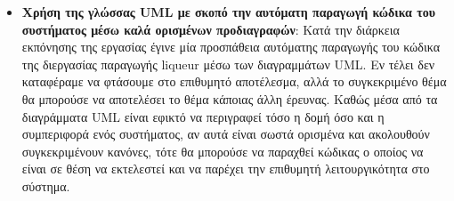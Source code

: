 \begin{itemize}
	\item{\textbf{Χρήση της γλώσσας UML με σκοπό την αυτόματη παραγωγή κώδικα του συστήματος μέσω καλά ορισμένων προδιαγραφών}: Κατά την διάρκεια εκπόνησης της εργασίας έγινε μία προσπάθεια αυτόματης παραγωγής του κώδικα της διεργασίας παραγωγής liqueur μέσω των διαγραμμάτων UML. Εν τέλει δεν καταφέραμε να φτάσουμε στο επιθυμητό αποτέλεσμα, αλλά το συγκεκριμένο θέμα θα μπορούσε να αποτελέσει το θέμα κάποιας άλλη έρευνας. Καθώς μέσα από τα διαγράμματα UML είναι εφικτό να περιγραφεί τόσο η δομή όσο και η συμπεριφορά ενός συστήματος, αν αυτά είναι σωστά ορισμένα και ακολουθούν συγκεκριμένουν κανόνες, τότε θα μπορούσε να παραχθεί κώδικας ο οποίος να είναι σε θέση να εκτελεστεί και να παρέχει την επιθυμητή λειτουργικότητα στο σύστημα.}
\end{itemize}
